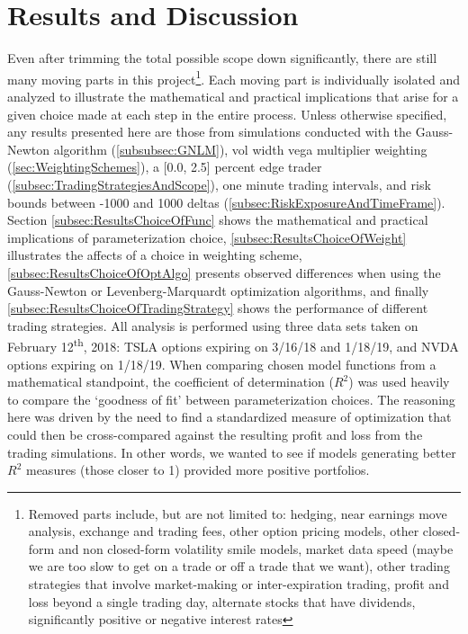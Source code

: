 \documentclass[12pt, a4paper, notitlepage]{article}
\numberwithin{equation}{subsection}
\numberwithin{figure}{subsection}
\numberwithin{table}{subsection}
\newcommand{\newpar}{\newline \newline}
\begin{document}
\section{Results and Discussion} \label{sec:Results}
Even after trimming the total possible scope down significantly, there are still many moving parts in this project\footnote{Removed parts include, but are not limited to:  hedging, near earnings move analysis, exchange and trading fees, other option pricing models, other closed-form and non closed-form volatility smile models, market data speed (maybe we are too slow to get on a trade or off a trade that we want), other trading strategies that involve market-making or inter-expiration trading, profit and loss beyond a single trading day, alternate stocks that have dividends, significantly positive or negative interest rates}.  Each moving part is individually isolated and analyzed to illustrate the mathematical and practical implications that arise for a given choice made at each step in the entire process.
\newpar
Unless otherwise specified, any results presented here are those from simulations conducted with the Gauss-Newton algorithm (\ref{subsubsec:GNLM}), vol width vega multiplier weighting (\ref{sec:WeightingSchemes}), a [0.0, 2.5] percent edge trader (\ref{subsec:TradingStrategiesAndScope}), one minute trading intervals, and risk bounds between -1000 and 1000 deltas (\ref{subsec:RiskExposureAndTimeFrame}).
\newpar
Section \ref{subsec:ResultsChoiceOfFunc} shows the mathematical and practical implications of parameterization choice, \ref{subsec:ResultsChoiceOfWeight} illustrates the affects of a choice in weighting scheme, \ref{subsec:ResultsChoiceOfOptAlgo} presents observed differences when using the Gauss-Newton or Levenberg-Marquardt optimization algorithms, and finally \ref{subsec:ResultsChoiceOfTradingStrategy} shows the performance of different trading strategies.  All analysis is performed using three data sets taken on February 12\textsuperscript{th}, 2018:  TSLA options expiring on 3/16/18 and 1/18/19, and NVDA options expiring on 1/18/19.
\newpar
When comparing chosen model functions from a mathematical standpoint, the coefficient of determination ($R^2$) was used heavily to compare the `goodness of fit' between parameterization choices.  The reasoning here was driven by the need to find a standardized measure of optimization that could then be cross-compared against the resulting profit and loss from the trading simulations.  In other words, we wanted to see if models generating better $R^2$ measures (those closer to 1) provided more positive portfolios.
\end{document}
